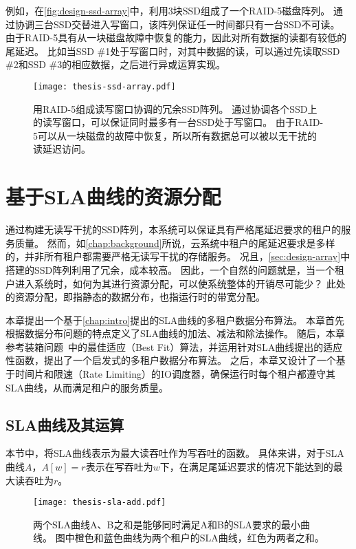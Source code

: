 例如，在\autoref{fig:design-ssd-array}中，利用3块SSD组成了一个RAID-5磁盘阵列。
通过协调三台SSD交替进入写窗口，该阵列保证任一时间都只有一台SSD不可读。
由于RAID-5具有从一块磁盘故障中恢复的能力，因此对所有数据的读都有较低的尾延迟。
比如当SSD \#1处于写窗口时，对其中数据的读，可以通过先读取SSD \#2和SSD \#3的相应数据，之后进行异或运算实现。

\begin{figure}[h]
  \centering
  \texttt{[image: thesis-ssd-array.pdf]}
  \caption{
        用RAID-5组成读写窗口协调的冗余SSD阵列。
        通过协调各个SSD上的读写窗口，可以保证同时最多有一台SSD处于写窗口。
        由于RAID-5可以从一块磁盘的故障中恢复，所以所有数据总可以被以无干扰的读延迟访问。
      }
  \label{fig:design-ssd-array}
\end{figure}

\section{基于SLA曲线的资源分配}
\label{sec:design-allocation}

通过构建无读写干扰的SSD阵列，本系统可以保证具有严格尾延迟要求的租户的服务质量。
然而，如\autoref{chap:background}所说，云系统中租户的尾延迟要求是多样的，并非所有租户都需要严格无读写干扰的存储服务。
况且，\autoref{sec:design-array}中搭建的SSD阵列利用了冗余，成本较高。
因此，一个自然的问题就是，当一个租户进入系统时，如何为其进行资源分配，可以使系统整体的开销尽可能少？
此处的资源分配，即指静态的数据分布，也指运行时的带宽分配。

本章提出一个基于\autoref{chap:intro}提出的SLA曲线的多租户数据分布算法。
本章首先根据数据分布问题的特点定义了SLA曲线的加法、减法和除法操作。
随后，本章参考装箱问题~\cite{wiki:Bin-packing}中的最佳适应（Best Fit）算法，并运用针对SLA曲线提出的适应性函数，提出了一个启发式的多租户数据分布算法。
之后，本章又设计了一个基于时间片和限速（Rate Limiting）的IO调度器，确保运行时每个租户都遵守其SLA曲线，从而满足租户的服务质量。

\subsection{SLA曲线及其运算}
\label{sec:design-allocation-sla-arithmetic}

本节中，将SLA曲线表示为最大读吞吐作为写吞吐的函数。
具体来讲，对于SLA曲线$A$，$A[w] = r$表示在写吞吐为$w$下，在满足尾延迟要求的情况下能达到的最大读吞吐为$r$。

\begin{figure}[h]
  \centering
  \texttt{[image: thesis-sla-add.pdf]}
  \caption{
        两个SLA曲线A、B之和是能够同时满足A和B的SLA要求的最小曲线。
        图中橙色和蓝色曲线为两个租户的SLA曲线，红色为两者之和。
      }
  \label{fig:design-sla-add}
\end{figure}

